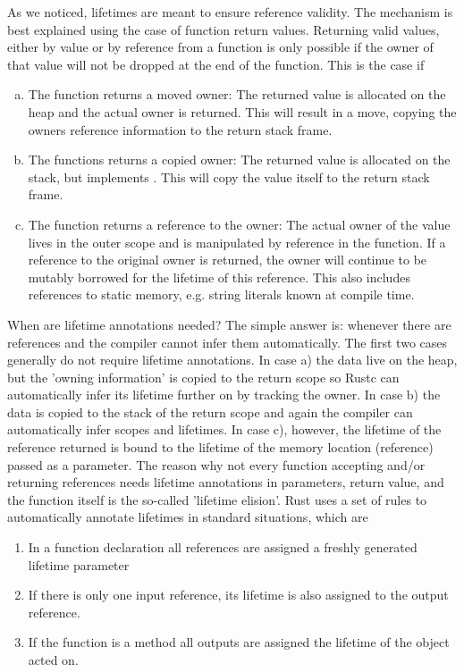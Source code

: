 As we noticed, lifetimes are meant to ensure reference validity. The mechanism is best explained using the case of function return values. Returning valid values, either by value or by reference from a function is only possible if the owner of that value will not be dropped at the end of the function. This is the case if 
\begin{enumerate}[a)]
    \item The function returns a moved owner: The returned value is allocated on the heap and the actual owner is returned. This will result in a move, copying the owners reference information to the return stack frame.
    \item The functions returns a copied owner: The returned value is allocated on the stack, but implements . This will copy the value itself to the return stack frame.
    \item The function returns a reference to the owner: The actual owner of the value lives in the outer scope and is manipulated by reference in the function. If a reference to the original owner is returned, the owner will continue to be mutably borrowed for the lifetime of this reference. This also includes references to static memory, e.g. string literals known at compile time. 
\end{enumerate}

When are lifetime annotations needed? The simple answer is: whenever there are references and the compiler cannot infer them automatically. The first two cases generally do not require lifetime annotations. In case a) the data live on the heap, but the 'owning information' is copied to the return scope so Rustc can automatically infer its lifetime further on by tracking the owner. In case b) the data is copied to the stack of the return scope and again the compiler can automatically infer scopes and lifetimes. In case c), however, the lifetime of the reference returned is bound to the lifetime of the memory location (reference) passed as a parameter. The reason why not every function accepting and/or returning references needs lifetime annotations in parameters, return value, and the function itself is the so-called 'lifetime elision'. Rust uses a set of rules to automatically annotate lifetimes in standard situations, which are
\begin{enumerate}
    \item In a function declaration all references are assigned a freshly generated lifetime parameter\\
    \item If there is only one input reference, its lifetime is also assigned to the output reference.\\
    \item If the function is a method all outputs are assigned the lifetime of the object acted on.\\  \\  
\end{enumerate}

